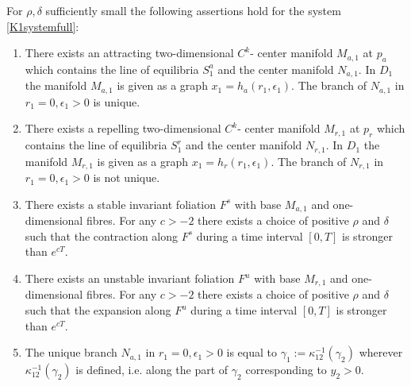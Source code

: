 \begin{prop}
For $\rho, \delta$ sufficiently small the following assertions hold for the system \ref{K1systemfull}:
\begin{enumerate}
\item There exists an attracting two-dimensional $C^k$- center manifold $M_{a,1}$ at $p_a$ which contains the line of equilibria $S_1^a$ and the center manifold $N_{a,1}$. In $D_1$ the manifold $M_{a,1}$ is given as a graph $x_1=h_a(r_1,\epsilon_1)$. The branch of $N_{a,1}$ in $r_1=0, \epsilon_1>0$ is unique.
\item There exists a repelling two-dimensional $C^k$- center manifold $M_{r,1}$ at $p_r$ which contains the line of equilibria $S_1^r$ and the center manifold $N_{r,1}$. In $D_1$ the manifold $M_{r,1}$ is given as a graph $x_1=h_r(r_1,\epsilon_1)$. The branch of $N_{r,1}$ in $r_1=0, \epsilon_1>0$ is not unique.
\item There exists a stable invariant foliation $F^s$ with base $M_{a,1}$ and one-dimensional fibres. For any $c>-2$ there exists a choice of positive $\rho$ and $\delta$ such that the contraction along $F^s$ during a time interval $[0,T]$ is stronger than $e^{cT}$.
\item There exists an unstable invariant foliation $F^u$ with base $M_{r,1}$ and one-dimensional fibres. For any $c>-2$ there exists a choice of positive $\rho$ and $\delta$ such that the expansion along $F^u$ during a time interval $[0,T]$ is stronger than $e^{cT}$.
\item The unique branch $N_{a,1}$ in $r_1=0, \epsilon_1>0$ is equal to $\gamma_1:= \kappa^{-1}_{12}(\gamma_2)$ wherever $\kappa^{-1}_{12}(\gamma_2)$ is defined, i.e. along the part of $\gamma_2$ corresponding to $y_2>0$.
\end{enumerate}
\end{prop}
 
